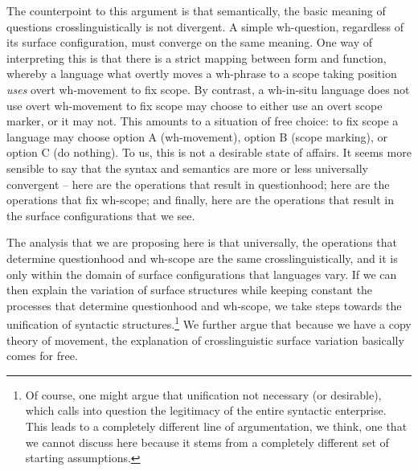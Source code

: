 \documentclass{glossa}
\begin{document}
The counterpoint to this argument is that semantically, the basic meaning of questions crosslinguistically is not divergent. A simple wh-question, regardless of its surface configuration, must converge on the same meaning. One way of interpreting this is that there is a strict mapping between form and function, whereby a language what overtly moves a wh-phrase to a scope taking position \textit{uses} overt wh-movement to fix scope. By contrast, a wh-in-situ language does not use overt wh-movement to fix scope may choose to either use an overt scope marker, or it may not. This amounts to a situation of free choice: to fix scope a language may choose option A (wh-movement), option B (scope marking), or option C (do nothing). To us, this is not a desirable state of affairs. It seems more sensible to say that the syntax and semantics are more or less universally convergent -- here are the operations that result in questionhood; here are the operations that fix wh-scope; and finally, here are the operations that result in the surface configurations that we see.

The analysis that we are proposing here is that universally, the operations that determine questionhood and wh-scope are the same crosslinguistically, and it is only within the domain of surface configurations that languages vary. If we can then explain the variation of surface structures while keeping constant the processes that determine questionhood and wh-scope, we take steps towards the unification of syntactic structures.\footnote{Of course, one might argue that unification not necessary (or desirable), which calls into question the legitimacy of the entire syntactic enterprise. This leads to a completely different line of argumentation, we think, one that we cannot discuss here because it stems from a completely different set of starting assumptions.} We further argue that because we have a copy theory of movement, the explanation of crosslinguistic surface variation basically comes for free.
\end{document}
